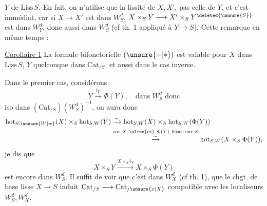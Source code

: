$Y$ de $\underline{\mathrm{Liss}}\,S$. En fait, on n'utilise que la lissité de $X,X'$, pas celle de $Y$, et c'est immédiat, car  si $X\longrightarrow X'$ est dans $W_S^d$, $X\times_S Y\longrightarrow X'\times_S Y^{\deleted{\unsure{S}}}$ est dans $W_Y^d$,  donc aussi dans $W_S^d$ (cf th. 1 appliqué à $Y\longrightarrow S$). Cette remarque   en même temps :

\uline{Corollaire 1}  La formule bifonctorielle $(\unsure{+|*})$ est valable pour $X$  dans $\underline{\mathrm{Liss}}\,S$, $Y$ quelconque dans $\mathrm{Cat}_{/S}$, et aussi dans le cas inverse.

Dans le premier cas, considérons
\[
 Y\xrightarrow{i_Y}\Phi(Y),\quad\text{dans }W_S^d\text{ donc}
\]
 iso dans $(\mathrm{Cat}_{/S})(W_S^d)^{-1}$, on aura donc
\[
\begin{aligned}
 \mathrm{hot}_{S,\unsure{W|w}}(X)\times_S\mathrm{hot}_{S,W}(Y)&\xrightarrow{\sim}\mathrm{hot}_{S,W}(X)\times_S\mathrm{hot}_{S,W}(\Phi(Y))\\
 &\overset{\substack{\text{car }X\ \text{\uline{et}}\ \Phi(Y)\ \text{lisses sur }S}}{\xrightarrow{\sim}}\mathrm{hot}_{S,W}(X\times_S\Phi(Y)),
\end{aligned}
\]
 je dis que
\[
 X\times_S Y\xrightarrow{X\times_S i_Y}X\times_S\Phi(Y)
\]
est encore dans $W_S^d$. Il suffit de voir que c'est dans $W_X^d$ (cf th. 1),   que le chgt. de base lisse $X\longrightarrow S$ induit $\mathrm{Cat}_{/S}\longrightarrow\mathrm{Cat}_{/\unsure{x|X}}$ compatible avec les localiseurs $W_S^d,W_X^d$.  

